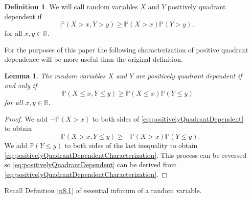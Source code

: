 \documentclass[bj]{imsart}
\numberwithin{equation}{section}
\renewcommand{\P}{\mathbb{P}}
\newcommand{\R}{\mathbb{R}}
\newcommand{\1}{\mathbf{1}}
\newtheorem{lemma}[thm]{Lemma}
\theoremstyle{definition}
\newtheorem{defin}[thm]{Definition}
\begin{document}
\begin{defin}
We will call random variables $X$ and $Y$ positively quadrant dependent if
\begin{equation}
 \P(X>x,Y>y)\geq \P(X>x)\P(Y>y),\label{eq:positivelyQuadrantDependent}
\end{equation}
for all $x,y\in \R$. 
\end{defin}

For the purposes of this paper the following characterization
of positive quadrant dependence
 will be more useful than the original definition.

\begin{lemma}\label{n11.1}
The random variables $X$ and $Y$ are positively quadrant dependent if and only if
\begin{equation}
 \P(X\leq x,Y\leq y)\geq \P(X\leq x)\P(Y \leq y)\label{eq:positivelyQuadrantDependentCharacterization}
\end{equation}
for all $x,y\in \R$. 
\end{lemma}
\begin{proof}
We add $-\P(X>x)$ to both sides
of \eqref{eq:positivelyQuadrantDependent} to obtain 
$$-\P(X>x,Y\leq y)\geq -\P(X>x)\P(Y\leq y).$$
We add $\P(Y\leq y)$ to  both sides of the last inequality to obtain \eqref{eq:positivelyQuadrantDependentCharacterization}.
This process can be reversed so \eqref{eq:positivelyQuadrantDependent} can be derived from \eqref{eq:positivelyQuadrantDependentCharacterization}.
\end{proof}

Recall Definition \ref{n8.1} of  essential infimum of a random variable.
\end{document}

